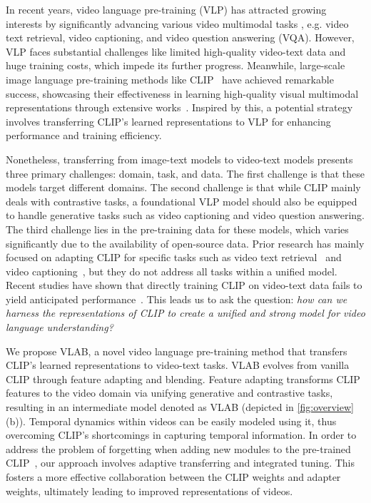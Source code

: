 \documentclass{article}
\begin{document}
In recent years, video language pre-training (VLP) has attracted growing interests by significantly advancing various video multimodal tasks \cite{li2022align,fu2021violet,wang2022git,wang2022all,bain2021frozen,li2022lavender,xue2022clip,zellers2021merlot,luo2020univl}, e.g. video text retrieval, video captioning, and video question answering (VQA). However, VLP faces substantial challenges like limited high-quality video-text data and huge training costs, which impede its further progress. Meanwhile, large-scale image language pre-training methods like CLIP~\cite{Radford2021LearningTV} have achieved remarkable success, showcasing their effectiveness in learning high-quality visual multimodal representations through extensive works~\cite{wang2022git,xue2022clip,gao2021clip2tv,tang2021clip4caption,zhong2022regionclip,luo2022clip4clip}. Inspired by this, a potential strategy involves transferring CLIP's learned representations to VLP for enhancing performance and training efficiency.

Nonetheless, transferring from image-text models to video-text models presents three primary challenges: domain, task, and data. 
 The first challenge is that these models target different domains. The second challenge is that while CLIP mainly deals with contrastive tasks, a foundational VLP model should also be equipped to handle generative tasks such as video captioning and video question answering. The third challenge lies in the pre-training data for these models, which varies significantly due to the availability of open-source data. Prior research has mainly focused on adapting CLIP for specific tasks such as video text retrieval~\cite{luo2022clip4clip,fang2021clip2video,xue2022clip} and video captioning~\cite{tang2021clip4caption,tewel2022zero}, but they do not address all tasks within a unified model. Recent studies have shown that directly training CLIP on video-text data fails to yield anticipated performance~\cite{xue2022clip,luo2022clip4clip}. This leads us to ask the question: \textit{how can we harness the representations of CLIP to create a unified and strong model for video language understanding?}

We propose VLAB, a novel video language pre-training method that transfers CLIP’s learned representations to video-text tasks. VLAB evolves from vanilla CLIP through feature adapting and blending. Feature adapting transforms CLIP features to the video domain via unifying generative and contrastive tasks, resulting in an intermediate model denoted as VLAB (depicted in \cref{fig:overview}(b)).  Temporal dynamics within videos can be easily modeled using it, thus overcoming CLIP's shortcomings in capturing temporal information. 
In order to address the problem of forgetting when adding new modules to the pre-trained CLIP~\cite{Radford2021LearningTV}, our approach involves adaptive transferring and integrated tuning. This fosters a more effective collaboration between the CLIP weights and adapter weights, ultimately leading to improved representations of videos. 
\end{document}
